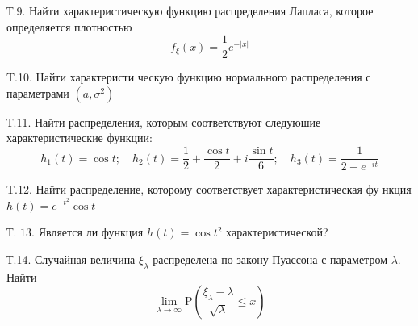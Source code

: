 \documentclass[a4paper,12pt]{article} %
\begin{document}
\begin{example}


Т.9. Найти характеристическую функцию распределения Лапласа, которое определяется плотностью
$$
f_{\xi}(x)=\frac{1}{2} e^{-|x|}
$$





\end{example}



\begin{example}

T.10. Найти характеристи ческую функцию нормального распределения с параметрами $\left(a, \sigma^{2}\right)$




\end{example}



\begin{example}

Т.11. Найти распределения, которым соответствуют следуюшие характеристические функции:
$$
h_{1}(t)=\cos t ; \quad h_{2}(t)=\frac{1}{2}+\frac{\cos t}{2}+i \frac{\sin t}{6} ; \quad h_{3}(t)=\frac{1}{2-e^{-i t}}
$$




\end{example}





\begin{example}


T.12. Найти распределение, которому соответствует характеристическая фу нкция $h(t)=e^{-t^{2}} \cos t$



\end{example}







\begin{example}

Т. $13 .$ Является ли функция $h(t)=\cos t^{2}$ характеристической?




\end{example}



\begin{example}

Т.14. Случайная величина $\xi_{\lambda}$ распределена по закону Пуассона с параметром $\lambda .$ Найти
$$
\lim _{\lambda \rightarrow \infty} \mathrm{P}\left(\frac{\xi_{\lambda}-\lambda}{\sqrt{\lambda}} \leqslant x\right)
$$




\end{example}
\end{document}
